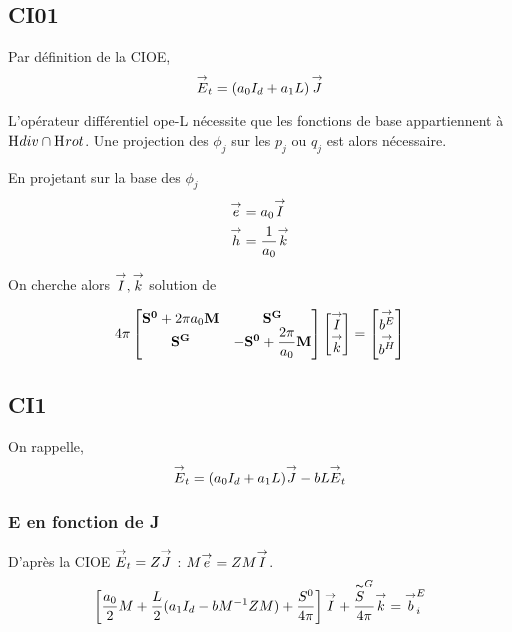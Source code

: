     \subsection{CI01}
      Par définition de la CIOE,
      \begin{equation}
          {\overset{\rightarrow}{E}}_t = \left(a_0I_d + a_1 L\right) {\overset{\rightarrow}{J}}
      \end{equation}

      L'opérateur différentiel \gls{ope-L} nécessite que les fonctions de base appartiennent à \(\mathrm{H}_\mathrm{{}}{div}\cap\mathrm{H}_\mathrm{{}}{rot}\). Une projection des $\phi_j$ sur les $p_j$ ou $q_j$ est alors nécessaire.

      En projetant sur la base des \(\phi_j\)
      \begin{align}
        {\overset{\rightarrow}{e}} &= a_0 {\overset{\rightarrow}{I}} \\
        {\overset{\rightarrow}{h}} &= \dfrac{1}{a_0} {\overset{\rightarrow}{k}}
      \end{align}

    On cherche alors \({\overset{\rightarrow}{I}},{\overset{\rightarrow}{k}}\) solution de 

    \begin{equation}
      4\pi
      \begin{bmatrix}
        \mathbf{S^0}+2\pi a_0 \mathbf{M} & \mathbf{S^G} \\
        \mathbf{S^G} & -\mathbf{S^0} +  \dfrac{2\pi}{a_0}\mathbf{M}
      \end{bmatrix}
      \begin{bmatrix}
        {\overset{\rightarrow}{I}}\\
        {\overset{\rightarrow}{k}}
      \end{bmatrix}
      =
      \begin{bmatrix}
        {\overset{\rightarrow}{b^E}}\\
        {\overset{\rightarrow}{b^H}}
      \end{bmatrix}     
    \end{equation}

    \subsection{CI1}
      On rappelle,
      \begin{equation}
        {\overset{\rightarrow}{E}}_t = (a_0I_d+a_1L){\overset{\rightarrow}{J}} -bL{\overset{\rightarrow}{E}}_t
      \end{equation}
      \subsubsection{E en fonction de J}
    D’après la CIOE \({\overset{\rightarrow}{E}}_t = Z{\overset{\rightarrow}{J}}\) : \(M{\overset{\rightarrow}{e}} = Z M{\overset{\rightarrow}{I}}\).
    \[
    \left[\dfrac{a_0}{2}M + \dfrac{L}{2}(a_1I_d - bM^{-1}ZM) + \dfrac{S^0}{4\pi}\right]{\overset{\rightarrow}{I}} + \dfrac{\overset{\thicksim}{S}^G }{4\pi}{\overset{\rightarrow}{k}} = {\overset{\rightarrow}{b}}_i^E
    \]
